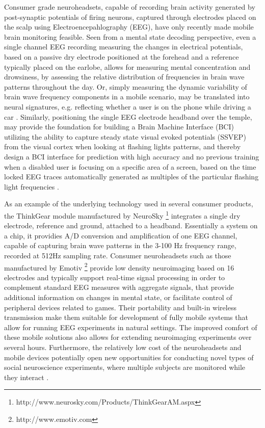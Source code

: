 \documentclass[10pt]{article}
\begin{document}
Consumer grade neuroheadsets, capable of recording brain activity generated by post-synaptic potentials of firing neurons, captured through electrodes placed on the scalp using Electroencepahlography (EEG), have only recently made mobile brain monitoring feasible. Seen from a mental state decoding perspective, even a single channel EEG recording measuring the changes in electrical potentials, based on a passive dry electrode positioned at the forehead and a reference typically placed on the  earlobe, allows for measuring mental concentration and drowsiness, by assessing the relative distribution of frequencies in brain wave patterns throughout the day. Or, simply measuring the dynamic variability of brain wave frequency components in a mobile scenario, may be translated into neural signatures, e.g. reflecting whether a user is on the phone while driving a car \cite{yasui2009brainwave}. Similarly, positioning the single EEG electrode headband over the temple, may provide the foundation for building a Brain Machine Interface (BCI) utilizing the ability to capture steady state visual evoked potentials (SSVEP) from the visual cortex when looking at flashing lights patterns, and thereby design a BCI interface for prediction with high accuracy and no previous training when a disabled user is focusing on a specific area of a screen, based on the time locked EEG traces automatically generated as multiples of the particular flashing light frequencies \cite{luo2010user}.

As an example of the underlying technology used in several consumer products, the ThinkGear module manufactured by NeuroSky \footnote{http://www.neurosky.com/Products/ThinkGearAM.aspx} integrates a single dry electrode, reference and ground, attached to a headband. Essentially a system on a chip, it providies A/D conversion and amplification of one EEG channel, capable of capturing brain wave patterns in the 3-100 Hz frequency range, recorded at 512Hz sampling rate. Consumer neuroheadsets such as those manufactured by Emotiv \footnote{http://www.emotiv.com} provide low density neuroimaging based on 16 electrodes and typically support real-time signal processing in order to complement standard EEG measures with aggregate signals, that provide additional information on changes in mental state, or facilitate control of peripheral devices related to games. Their portability and built-in wireless transmission make them suitable for development of fully mobile systems that allow for running EEG experiments in natural settings. The improved comfort of these mobile solutions also allows for extending neuroimaging experiments over several hours. Furthermore, the relatively low cost of the neuroheadsets and mobile devices potentially open new opportunities for conducting novel types of social neuroscience experiments, where multiple subjects are monitored while they interact \cite{konvalinka2012two,dumas2011towards}.
\end{document}
